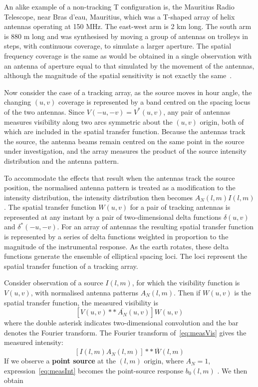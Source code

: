 An alike example of a non-tracking T configuration is, the Mauritius Radio Telescope, near Bras d’eau, Mauritius, which was a T-shaped array of helix antennas operating at 150 MHz. The east-west arm is 2 km long. The south arm is 880 m long and was synthesised by moving a group of antennas on trolleys in steps, with continuous coverage, to simulate a larger aperture. The spatial frequency coverage is the same as would be obtained in a single observation with an antenna of aperture equal to that simulated by the movement of the antennas, although the magnitude of the spatial sensitivity is not exactly the same~{\citep[Sec.~5.6~Pg.~155,~Sec.~5.3~Pg.~137]{thompson2008interferometry}}.

Now consider the case of a tracking array, as the source moves in hour angle, the changing $(u,v )$ coverage is represented by a band centred on the spacing locus of the two antennas. Since $V(-u,-v) = V^{*}(u,v)$, any pair of antennas measures visibility along two arcs symmetric about the $(u,v)$ origin, both of which are included in the spatial transfer function. Because the antennas track the source, the antenna beams remain centred on the same point in the source under investigation, and the array measures the product of the source intensity distribution and the antenna pattern. 

To accommodate the effects that result when the antennas track the source position, the normalised antenna pattern is treated as a modification to the intensity distribution, the intensity distribution then becomes $A_N(l,m)I(l,m)$. The spatial transfer function $W(u,v)$ for a pair of tracking antennas is represented at any instant by a pair of two-dimensional delta functions
$\delta(u, v )$ and $\delta^{\ast}(-u,-v)$. For an array of antennas the resulting spatial transfer function is represented by a series of delta functions weighted in proportion to the magnitude of the instrumental response. As the earth rotates, these delta functions generate the ensemble of elliptical spacing loci. The loci represent the spatial transfer function of a tracking array.

Consider observation of a source $I(l,m)$, for which the visibility function is $V(u ,v)$, with normalised antenna patterns $A_N(l,m)$. Then if $W(u ,v)$ is the spatial transfer function, the measured visibility is 
\begin{equation}
\label{eq:measVis}
[V(u,v)\ast{\ast}{\,}\overline{A_N}(u,v)]W(u,v)
\end{equation}
where the double asterisk indicates two-dimensional convolution and the bar denotes the Fourier transform. The Fourier transform of~\ref{eq:measVis} gives the measured intensity:
\begin{equation}
\label{eq:measInt}
[I(l,m){A}_N(l,m)]\ast{\ast}{\,}\overline{W}(l,m)
\end{equation}
If we observe a \textbf{point source} at the $(l,m)$ origin, where ${A}_N = 1$, expression~\ref{eq:measInt} becomes the point-source response $b_0(l,m)$ . We then obtain

